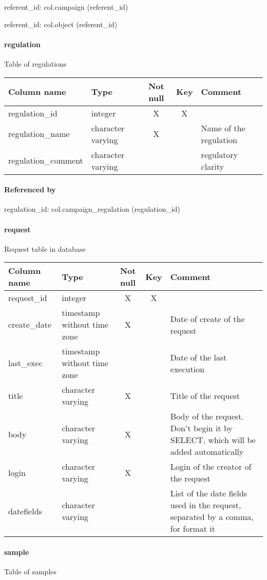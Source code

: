 referent\_id: col.campaign (referent\_id)

referent\_id: col.object (referent\_id)

\paragraph{regulation}
Table of regulations

\begin{tabular}{|l| p{2cm}|c|c| p{5cm}|}
\hline
Column name & Type & Not null & Key & Comment \\
\hline
regulation\_id & integer & X & X & \\
regulation\_name & character varying & X &  & Name of the regulation\\
regulation\_comment & character varying &  &  & regulatory clarity\\
\hline
\end{tabular}
\paragraph{Referenced by}
regulation\_id: col.campaign\_regulation (regulation\_id)

\paragraph{request}
Request table in database

\begin{tabular}{|l| p{2cm}|c|c| p{5cm}|}
\hline
Column name & Type & Not null & Key & Comment \\
\hline
request\_id & integer & X & X & \\
create\_date & timestamp without time zone & X &  & Date of create of the request\\
last\_exec & timestamp without time zone &  &  & Date of the last execution\\
title & character varying & X &  & Title of the request\\
body & character varying & X &  & Body of the request. Don't begin it by SELECT, which will be added automatically\\
login & character varying & X &  & Login of the creator of the request\\
datefields & character varying &  &  & List of the date fields used in the request, separated by a comma, for format it\\
\hline
\end{tabular}
\paragraph{sample}
Table of samples

